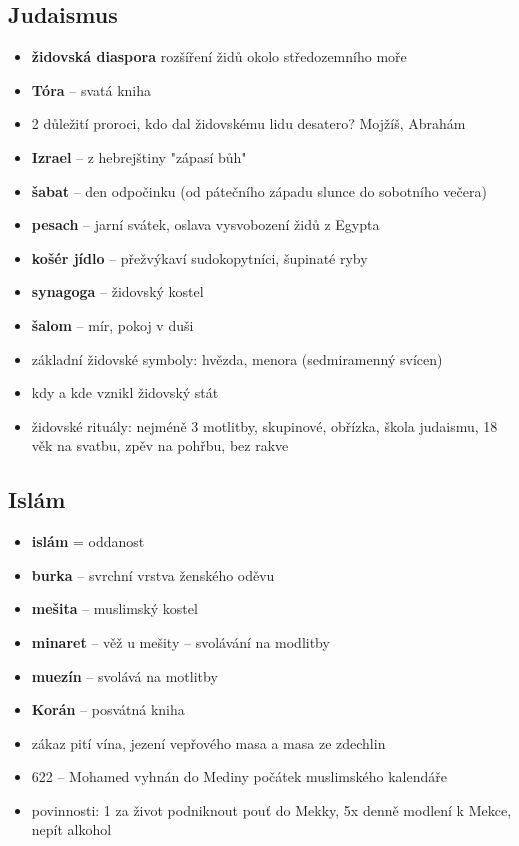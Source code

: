 \subsection{Judaismus}
\begin{itemize}
\item \textbf{židovská diaspora} rozšíření židů okolo středozemního moře
\item \textbf{Tóra} -- svatá kniha
\item 2 důležití proroci, kdo dal židovskému lidu desatero? Mojžíš, Abrahám
\item \textbf{Izrael} -- z hebrejštiny "zápasí bůh"
\item \textbf{šabat} -- den odpočinku (od pátečního západu slunce do sobotního večera)
\item \textbf{pesach}  -- jarní svátek, oslava vysvobození židů z Egypta
\item \textbf{košér jídlo} -- přežvýkaví sudokopytníci, šupinaté ryby
\item \textbf{synagoga} -- židovský kostel
\item \textbf{šalom} -- mír, pokoj v duši
\item základní židovské symboly: hvězda, menora (sedmiramenný svícen)
\item kdy a kde vznikl židovský stát
\item židovské rituály: nejméně 3 motlitby, skupinové, obřízka, škola judaismu, 18 věk na svatbu, zpěv na pohřbu, bez rakve
\end{itemize}

\subsection{Islám}
\begin{itemize}
\item \textbf{islám} = oddanost
\item \textbf{burka} -- svrchní vrstva ženského oděvu
\item \textbf{mešita} -- muslimský kostel
\item \textbf{minaret} -- věž u mešity -- svolávání na modlitby
\item \textbf{muezín} -- svolává na motlitby
\item \textbf{Korán} -- posvátná kniha
\item zákaz pití vína, jezení vepřového masa a masa ze zdechlin
\item 622 -- Mohamed vyhnán do Mediny \ra počátek muslimského kalendáře
\item povinnosti: 1 za život podniknout pouť do Mekky, 5x denně modlení k Mekce, nepít alkohol
\end{itemize}


